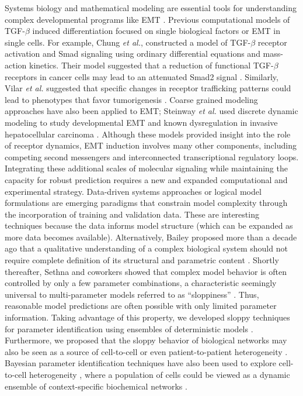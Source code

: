 \documentclass[11pt,letterpaper]{article}
\begin{document}
Systems biology and mathematical modeling are essential tools for understanding complex developmental programs like EMT \cite{Ahmed:2007mi}.
Previous computational models of TGF-$\beta$ induced differentiation focused on single biological factors or EMT in single cells.
For example, Chung \emph{et al.}, constructed a model of TGF-$\beta$ receptor activation and Smad signaling using ordinary differential equations and mass-action kinetics.
Their model suggested that a reduction of functional TGF-$\beta$ receptors in cancer cells may lead to an attenuated Smad2 signal \cite{Chung:2009jl}.
Similarly, Vilar \emph{et al.} suggested that specific changes in receptor trafficking patterns could lead to phenotypes that favor tumorigenesis \cite{Vilar:2006gb}.
Coarse grained modeling approaches have also been applied to EMT; Steinway \emph{et al.} used discrete dynamic modeling to study developmental EMT and known dysregulation in invasive hepatocellular carcinoma \cite{Steinway:2014aa}.
Although these models provided insight into the role of receptor dynamics, EMT induction involves many other components, including competing second messengers and interconnected transcriptional regulatory loops.
Integrating these additional scales of molecular signaling while maintaining the capacity for robust prediction requires a new and expanded computational and experimental strategy.
Data-driven systems approaches \cite{Cirit:2012kx} or logical model formulations \cite{Morris:2011ys} are emerging paradigms that constrain model complexity through the incorporation of training and validation data.
These are interesting techniques because the data informs model structure (which can be expanded as more data becomes available).
Alternatively, Bailey proposed more than a decade ago that a qualitative understanding of a complex biological system should not require complete definition of its structural and parametric content \cite{2001_bailey_NatBiotech}.
Shortly thereafter, Sethna and coworkers showed that complex model behavior is often controlled by only a few parameter combinations, a characteristic seemingly universal to multi-parameter models referred to as ``sloppiness'' \cite{Machta:2013by}.
Thus, reasonable model predictions are often possible with only limited parameter information.
Taking advantage of this property, we developed sloppy techniques for parameter identification using ensembles of deterministic models \cite{Song:2010fk}.
Furthermore, we proposed that the sloppy behavior of biological networks may also be seen as a source of cell-to-cell \cite{Lequieu:2011fj} or even patient-to-patient heterogeneity \cite{2010_luan_varner_MolBioSys}.
Bayesian parameter identification techniques have also been used to explore cell-to-cell heterogeneity  \cite{2011_kalita_brasier_JBC,2011_hasenauer_allgower_BMCBioinfo},
where a population of cells could be viewed as a dynamic ensemble of context-specific biochemical networks \cite{2012_creixell_linding_NatBiotech}.
\end{document}
